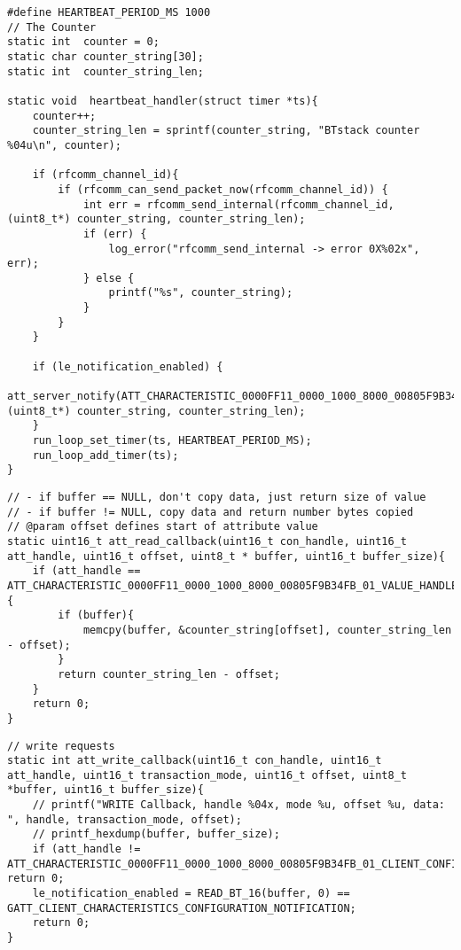 \begin{lstlisting}[caption= SPP\&LE client - heartbeat handler., label=code:spp_le_heartbeat_handler]
#define HEARTBEAT_PERIOD_MS 1000
// The Counter
static int  counter = 0;
static char counter_string[30];
static int  counter_string_len;

static void  heartbeat_handler(struct timer *ts){
    counter++;
    counter_string_len = sprintf(counter_string, "BTstack counter %04u\n", counter);

    if (rfcomm_channel_id){
        if (rfcomm_can_send_packet_now(rfcomm_channel_id)) {
            int err = rfcomm_send_internal(rfcomm_channel_id, (uint8_t*) counter_string, counter_string_len);
            if (err) {
                log_error("rfcomm_send_internal -> error 0X%02x", err);
            } else {
                printf("%s", counter_string);
            }
        }
    }

    if (le_notification_enabled) {
        att_server_notify(ATT_CHARACTERISTIC_0000FF11_0000_1000_8000_00805F9B34FB_01_VALUE_HANDLE, (uint8_t*) counter_string, counter_string_len);
    }
    run_loop_set_timer(ts, HEARTBEAT_PERIOD_MS);
    run_loop_add_timer(ts);
} 
\end{lstlisting}

\begin{lstlisting}[caption= SPP\&LE client - ATT Client Read Callback for Dynamic Data., label=code:spp_le_read_callback]
// - if buffer == NULL, don't copy data, just return size of value
// - if buffer != NULL, copy data and return number bytes copied
// @param offset defines start of attribute value
static uint16_t att_read_callback(uint16_t con_handle, uint16_t att_handle, uint16_t offset, uint8_t * buffer, uint16_t buffer_size){
    if (att_handle == ATT_CHARACTERISTIC_0000FF11_0000_1000_8000_00805F9B34FB_01_VALUE_HANDLE){
        if (buffer){
            memcpy(buffer, &counter_string[offset], counter_string_len - offset);
        }
        return counter_string_len - offset;
    }
    return 0;
}
\end{lstlisting}

\begin{lstlisting}[caption= SPP\&LE client - ATT Client Write Callback., label=code:spp_le_write_callback]
// write requests
static int att_write_callback(uint16_t con_handle, uint16_t att_handle, uint16_t transaction_mode, uint16_t offset, uint8_t *buffer, uint16_t buffer_size){
    // printf("WRITE Callback, handle %04x, mode %u, offset %u, data: ", handle, transaction_mode, offset);
    // printf_hexdump(buffer, buffer_size);
    if (att_handle != ATT_CHARACTERISTIC_0000FF11_0000_1000_8000_00805F9B34FB_01_CLIENT_CONFIGURATION_HANDLE) return 0;
    le_notification_enabled = READ_BT_16(buffer, 0) == GATT_CLIENT_CHARACTERISTICS_CONFIGURATION_NOTIFICATION;
    return 0;
}
\end{lstlisting}


